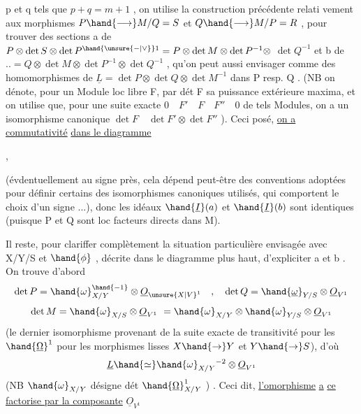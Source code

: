 
p et q tels que $p+q=m+1$ , on utilise la construction précédente relati
vement aux morphismes $P\hand{\longrightarrow} M/Q = S$ et $Q\hand{\longrightarrow} M/P = R$ , pour trouver
des sections  a de $P \otimes \det S \otimes \det P^{\hand{\unsure{-|\vee}}1} = P \otimes \det M \otimes \det P^{-1} \otimes$
$\det Q^{-1}$ et b de $.. = Q \otimes \det M \otimes \det P^{-1} \otimes \det Q^{-1}$ , qu'on peut
aussi envisager comme des homomorphismes de $\underline{L} = \det P \otimes \det Q \otimes \det M^{-1}$
dans P resp. Q . (NB on dénote, pour un Module loc libre F, par dét F
sa puissance extérieure maxima, et on utilise que, pour une suite
exacte $0 \quad F' \quad F \quad F'' \quad 0$ de tels Modules, on a un isomorphisme
canonique $\det F \quad \det F' \otimes \det F''$ ). Ceci posé, \uline{on a commutativité}
\uline{dans le diagramme}

,

(évdentuellement au signe près, cela dépend peut-être des conventions
adoptées pour définir certains des isomorphismes canoniques utilisés,
qui comportent le choix d'un signe ...), donc les idéaux $\hand{\underline{I}}(a)$ et $\hand{\underline{I}}(b)$
sont identiques (puisque P et Q sont loc facteurs directs dans M). 

Il reste, pour clariffer complètement la situation particulière
envisagée avec X/Y/S et $\hand{\phi}$ , décrite dans le diagramme  plus haut, 
d'expliciter a et b . On trouve d'abord
\[ \det P = \hand{\omega}_{X/Y}^{\hand{-1}} \otimes \underline{O}_{\unsure{X|V}^{1}} \quad , \quad \det Q = \hand{\underline{\omega}}_{Y/S} \otimes \underline{O}_{V^{1}} \]
\[ \det M = \hand{\omega}_{X/S} \otimes \underline{O}_{V^{1}} \ = \hand{\omega}_{X/Y} \otimes \hand{\omega}_{Y/S} \otimes \underline{O}_{V^{1}} \]
(le dernier isomorphisme provenant de la suite exacte de transitivité
pour les $\hand{\underline{\Omega}}^1$ pour les morphismes lisses $X\hand{\to}Y$ et $Y\hand{\to}S$), d'où
\[ \underline{L} \hand{\simeq} \hand{\omega}_{X/Y}{}^{-2} \otimes \underline{O}_{V^{1}} \]
(NB $\hand{\omega}_{X/Y}$ désigne  dét $\hand{\underline{\Omega}}^1_{X/Y}$ ) . Ceci dit, \uline{l'omorphisme} \uline{a} \uline{ce}
\uline{factorise par la composante} $\underline{O}_{V^{1}}$

